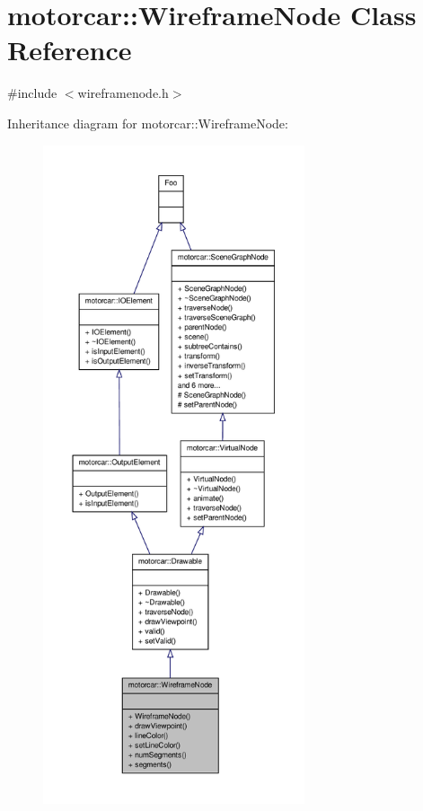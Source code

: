 \hypertarget{classmotorcar_1_1WireframeNode}{\section{motorcar\-:\-:Wireframe\-Node Class Reference}
\label{classmotorcar_1_1WireframeNode}
}


{\ttfamily \#include $<$wireframenode.\-h$>$}



Inheritance diagram for motorcar\-:\-:Wireframe\-Node\-:
\nopagebreak
\begin{figure}[H]
\begin{center}
\leavevmode
\includegraphics[height=550pt]{classmotorcar_1_1WireframeNode__inherit__graph}
\end{center}
\end{figure}


